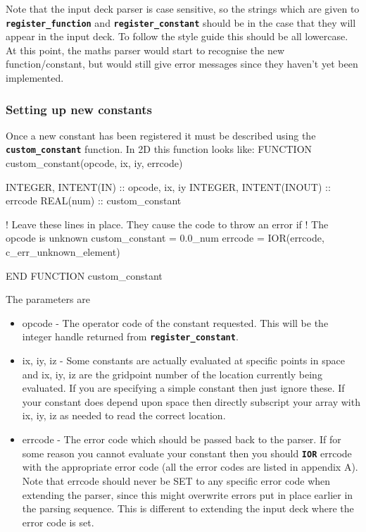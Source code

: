 \documentclass[12pt,a4paper]{article}
\newcommand{\inlinecode}[1]{{\color{warwickred} \bf\texttt{#1}}}
\newcommand{\EPOCH}{{\color{warwickdark}\fontfamily{phv}\selectfont{EPOCH}}}
\newenvironment{boxverbatim}{\lboxverbatim{none}}{\endlboxverbatim}
\begin{document}
Note that the input deck parser is case sensitive, so the strings which are
given to \inlinecode{register\_function} and \inlinecode{register\_constant}
should be in the case that they will appear in the input deck. To follow the
{\EPOCH} style guide this should be all lowercase. At this point, the maths
parser would start to recognise the new function/constant, but would still
give error messages since they haven't yet been implemented.

\subsubsection{Setting up new constants}

Once a new constant has been registered it must be described using the
\inlinecode{custom\_constant} function. In 2D this function looks like:
\begin{boxverbatim}
FUNCTION custom_constant(opcode, ix, iy, errcode)

  INTEGER, INTENT(IN) :: opcode, ix, iy
  INTEGER, INTENT(INOUT) :: errcode
  REAL(num) :: custom_constant

  ! Leave these lines in place. They cause the code to throw an error if
  ! The opcode is unknown
  custom_constant = 0.0_num
  errcode = IOR(errcode, c_err_unknown_element)

END FUNCTION custom_constant
\end{boxverbatim}

The parameters are

\begin{itemize}
\item opcode - The operator code of the constant requested. This will be the
  integer handle returned from \inlinecode{register\_constant}.
\item ix, iy, iz - Some constants are actually evaluated at specific points in
  space and ix, iy, iz are the gridpoint number of the location currently being
  evaluated. If you are specifying a simple constant then just ignore
  these. If your constant does depend upon space then directly subscript your
  array with ix, iy, iz as needed to read the correct location.
\item errcode - The error code which should be passed back to the
  parser. If for some reason you cannot evaluate your constant then you should
  \inlinecode{IOR} errcode with the appropriate error code (all the error
  codes are listed in appendix A). Note that errcode should never be SET to
  any specific error code when extending the parser, since this might
  overwrite errors put in place earlier in the parsing sequence. This is
  different to extending the input deck where the error code is set.
\end{itemize}
\end{document}
